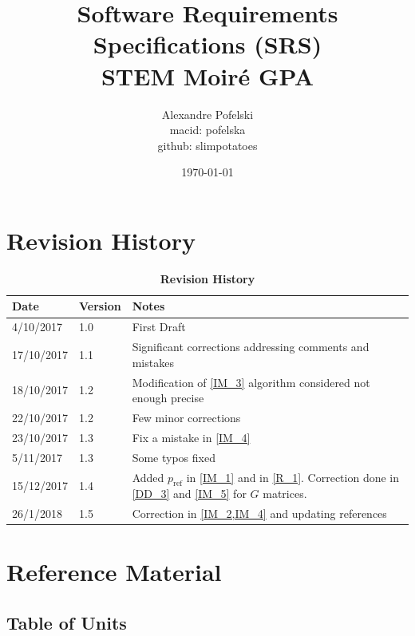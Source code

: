\documentclass[12pt]{article}
\begin{document}
\title{Software Requirements Specifications (SRS) \\
STEM Moir{\'e} GPA} 
\author{Alexandre Pofelski \\
		macid: pofelska \\
		github: slimpotatoes}
\date{\today}

\maketitle

\clearpage

\tableofcontents

\clearpage

\section{Revision History}

\begin{table}[h]
\caption{\bf Revision History}
\begin{tabularx}{\textwidth}{p{3cm}p{2cm}X}
\toprule {\bf Date} & {\bf Version} & {\bf Notes}\\
\midrule
4/10/2017 & 1.0 & First Draft\\
17/10/2017 & 1.1 & Significant corrections addressing comments and mistakes\\
18/10/2017 & 1.2 & Modification of \cref{IM_3} algorithm considered not enough 
precise\\
22/10/2017 & 1.2 & Few minor corrections\\
23/10/2017 & 1.3 & Fix a mistake in \cref{IM_4}\\
5/11/2017 & 1.3 & Some typos fixed\\
15/12/2017 & 1.4 & Added $p_{\text{ref}}$ in \cref{IM_1} and in \cref{R_1}. 
Correction done in \cref{DD_3} and \cref{IM_5} for $G$ matrices. \\
26/1/2018 & 1.5 & Correction in \cref{IM_2,IM_4} and updating references\\

\bottomrule
\end{tabularx}
\end{table}

\clearpage

\section{Reference Material}

\subsection{Table of Units}
\end{document}
